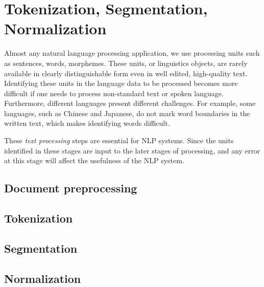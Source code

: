 \chapter{Tokenization, Segmentation, Normalization}

Almost any natural language processing application,
we use processing units such as sentences, words, morphemes.
These units, or linguistics objects,
are rarely available in clearly distinguishable form
even in well edited, high-quality text.
Identifying these units in the language data to be processed becomes
more difficult if one needs to process non-standard text or spoken language.
Furthermore,
different languages present different challenges.
For example,
some languages, such as Chinese and Japanese,
do not mark word boundaries in the written text,
which makes identifying words difficult.

These \emph{text processing} steps are essential for NLP systems.
Since the units identified in these stages are
input to the later stages of processing,
and any error at this stage will affect the usefulness of the NLP system.

\section{Document preprocessing}

\section{Tokenization}

\section{Segmentation}

\section{Normalization}

